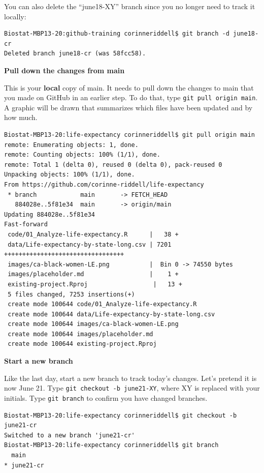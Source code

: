 \documentclass[
]{book}
\begin{document}
You can also delete the ``june18-XY'' branch since you no longer need to track it
locally:

\begin{verbatim}
Biostat-MBP13-20:github-training corinneriddell$ git branch -d june18-cr
Deleted branch june18-cr (was 58fcc58).
\end{verbatim}

\textbf{Pull down the changes from main}

This is your \textbf{local} copy of main. It needs to pull down the changes to
main that you made on GitHub in an earlier step. To do that, type \texttt{git\ pull\ origin\ main}.
A graphic will be drawn that summarizes which files have been updated and by
how much.

\begin{verbatim}
Biostat-MBP13-20:life-expectancy corinneriddell$ git pull origin main
remote: Enumerating objects: 1, done.
remote: Counting objects: 100% (1/1), done.
remote: Total 1 (delta 0), reused 0 (delta 0), pack-reused 0
Unpacking objects: 100% (1/1), done.
From https://github.com/corinne-riddell/life-expectancy
 * branch            main       -> FETCH_HEAD
   884028e..5f81e34  main       -> origin/main
Updating 884028e..5f81e34
Fast-forward
 code/01_Analyze-life-expectancy.R      |   38 +
 data/Life-expectancy-by-state-long.csv | 7201 +++++++++++++++++++++++++++++++++
 images/ca-black-women-LE.png           |  Bin 0 -> 74550 bytes
 images/placeholder.md                  |    1 +
 existing-project.Rproj                  |   13 +
 5 files changed, 7253 insertions(+)
 create mode 100644 code/01_Analyze-life-expectancy.R
 create mode 100644 data/Life-expectancy-by-state-long.csv
 create mode 100644 images/ca-black-women-LE.png
 create mode 100644 images/placeholder.md
 create mode 100644 existing-project.Rproj
\end{verbatim}

\textbf{Start a new branch}

Like the last day, start a new branch to track today's changes. Let's
pretend it is now June 21. Type \texttt{git\ checkout\ -b\ june21-XY}, where XY is replaced
with your initials. Type \texttt{git\ branch} to confirm you have changed branches.

\begin{verbatim}
Biostat-MBP13-20:life-expectancy corinneriddell$ git checkout -b june21-cr
Switched to a new branch 'june21-cr'
Biostat-MBP13-20:life-expectancy corinneriddell$ git branch
  main
* june21-cr
\end{verbatim}
\end{document}
